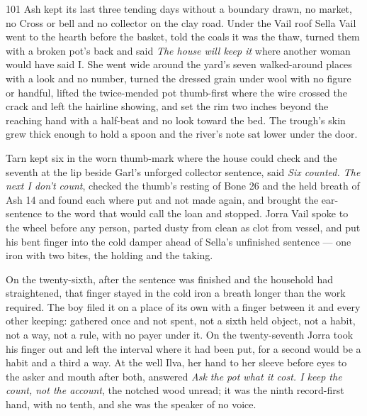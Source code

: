 
\scenebreak


\scenebreak


\scenebreak

\CRtailpiece
\begin{CRchronicle}{101}
Ash kept its last three tending days without a boundary drawn, no market, no Cross or bell and no collector on the clay road. Under the Vail roof Sella Vail went to the hearth before the basket, told the coals it was the thaw, turned them with a broken pot’s back and said \emph{The house will keep it} where another woman would have said I. She went wide around the yard’s seven walked-around places with a look and no number, turned the dressed grain under wool with no figure or handful, lifted the twice-mended pot thumb-first where the wire crossed the crack and left the hairline showing, and set the rim two inches beyond the reaching hand with a half-beat and no look toward the bed. The trough’s skin grew thick enough to hold a spoon and the river’s note sat lower under the door.

Tarn kept six in the worn thumb-mark where the house could check and the seventh at the lip beside Garl’s unforged collector sentence, said \emph{Six counted. The next I don’t count}, checked the thumb’s resting of Bone 26 and the held breath of Ash 14 and found each where put and not made again, and brought the ear-sentence to the word that would call the loan and stopped. Jorra Vail spoke to the wheel before any person, parted dusty from clean as clot from vessel, and put his bent finger into the cold damper ahead of Sella’s unfinished sentence --- one iron with two bites, the holding and the taking.

On the twenty-sixth, after the sentence was finished and the household had straightened, that finger stayed in the cold iron a breath longer than the work required. The boy filed it on a place of its own with a finger between it and every other keeping: gathered once and not spent, not a sixth held object, not a habit, not a way, not a rule, with no payer under it. On the twenty-seventh Jorra took his finger out and left the interval where it had been put, for a second would be a habit and a third a way. At the well Ilva, her hand to her sleeve before eyes to the asker and mouth after both, answered \emph{Ask the pot what it cost. I keep the count, not the account}, the notched wood unread; it was the ninth record-first hand, with no tenth, and she was the speaker of no voice.


\end{CRchronicle}
